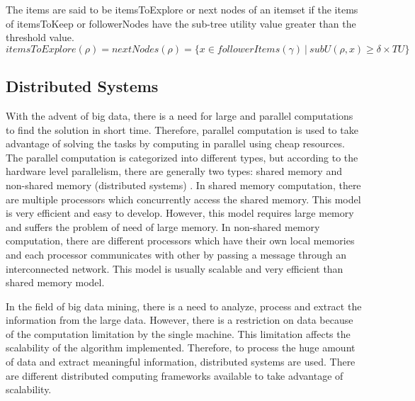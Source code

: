 \documentclass[11pt,openright]{report}
\begin{document}
\begin{definition}
	The items are said to be itemsToExplore or next nodes of an itemset if the items of itemsToKeep or followerNodes have the sub-tree utility value greater than the threshold value.
	\begin{equation}
		itemsToExplore(\rho) = nextNodes(\rho) = \{x \in followerItems(\gamma)\ |\ subU(\rho, x) \geq \delta \times TU\}
		\label{eq:itemsToExplore}
	\end{equation}
	\label{def:itemsToExplore}
\end{definition}

\subsection{Distributed Systems}
With the advent of big data, there is a need for large and parallel computations to find the solution in short time. Therefore, parallel computation is used to take advantage of solving the tasks by computing in parallel using cheap resources. The parallel computation is categorized into different types, but according to the hardware level parallelism, there are generally two types: shared memory and non-shared memory (distributed systems) \cite{Dean2008}. In shared memory computation, there are multiple processors which concurrently access the shared memory. This model is very efficient and easy to develop. However, this model requires large memory and suffers the problem of need of large memory. In non-shared memory computation, there are different processors which have their own local memories and each processor communicates with other by passing a message through an interconnected network. This model is usually scalable and very efficient than shared memory model. 

In the field of big data mining, there is a need to analyze, process and extract the information from the large data. However, there is a restriction on data because of the computation limitation by the single machine. This limitation affects the scalability of the algorithm implemented. Therefore, to process the huge amount of data and extract meaningful information, distributed systems are used. There are different distributed computing frameworks available to take advantage of scalability. 
\end{document}

